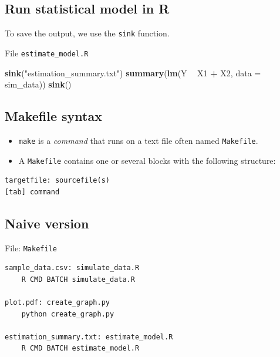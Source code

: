 \documentclass[]{book}
\newenvironment{Shaded}{\begin{snugshade}}{\end{snugshade}}
\newcommand{\KeywordTok}[1]{\textcolor[rgb]{0.13,0.29,0.53}{\textbf{#1}}}
\newcommand{\DataTypeTok}[1]{\textcolor[rgb]{0.13,0.29,0.53}{#1}}
\newcommand{\StringTok}[1]{\textcolor[rgb]{0.31,0.60,0.02}{#1}}
\newcommand{\OperatorTok}[1]{\textcolor[rgb]{0.81,0.36,0.00}{\textbf{#1}}}
\newcommand{\NormalTok}[1]{#1}
\theoremstyle{definition}
\theoremstyle{definition}
\theoremstyle{definition}
\theoremstyle{remark}
\begin{document}
\subsection{Run statistical model in
R}\label{run-statistical-model-in-r-1}

To save the output, we use the \texttt{sink} function.

File \texttt{estimate\_model.R}

\begin{Shaded}
\begin{Highlighting}[]
\KeywordTok{sink}\NormalTok{(}\StringTok{"estimation_summary.txt"}\NormalTok{)}
\KeywordTok{summary}\NormalTok{(}\KeywordTok{lm}\NormalTok{(Y }\OperatorTok{~}\StringTok{ }\NormalTok{X1 }\OperatorTok{+}\StringTok{ }\NormalTok{X2, }\DataTypeTok{data =}\NormalTok{ sim_data))}
\KeywordTok{sink}\NormalTok{()}
\end{Highlighting}
\end{Shaded}

\subsection{Makefile syntax}\label{makefile-syntax}

\begin{itemize}
\item
  \texttt{make} is a \emph{command} that runs on a text file often named
  \texttt{Makefile}.
\item
  A \texttt{Makefile} contains one or several blocks with the following
  structure:
\end{itemize}

\begin{verbatim}
targetfile: sourcefile(s)
[tab] command
\end{verbatim}

\subsection{Naive version}\label{naive-version}

File: \texttt{Makefile}

\begin{verbatim}
sample_data.csv: simulate_data.R
    R CMD BATCH simulate_data.R

plot.pdf: create_graph.py
    python create_graph.py

estimation_summary.txt: estimate_model.R
    R CMD BATCH estimate_model.R
\end{verbatim}
\end{document}
